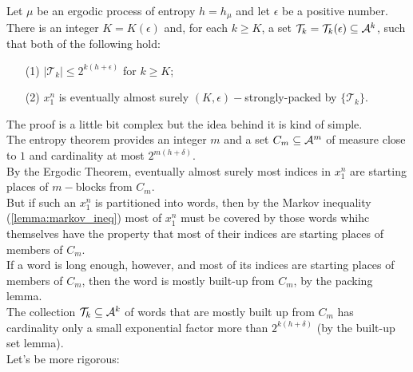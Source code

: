 \begin{lemma}
    Let $\mu$ be an ergodic process of entropy $h=h_\mu$ and let $\epsilon$ be a positive number.
    \\There is an integer $K=K(\epsilon)$ and, for each $k\geq K$, a set $\mathcal{T}_k = \mathcal{T}_k(\epsilon) \subseteq \mathcal{A}^k$, such that both of the following hold:
    \begin{itemize}
        \item[(1)] $|\mathcal{T}_k| \leq 2^{k(h+ \epsilon)}$ for $k \geq K$;
        \item[(2)] $x_1^n$ is eventually almost surely $(K, \epsilon)-$strongly-packed by $\{\mathcal{T}_k \}$.
    \end{itemize}
\end{lemma}
The proof is a little bit complex but the idea behind it is kind of simple.
\\The entropy theorem provides an integer $m$ and a set $C_m \subseteq \mathcal{A}^m$ of measure close to $1$ and cardinality at most $2^{m(h+ \delta)}$.
\\By the Ergodic Theorem, eventually almost surely most indices in $x_1^n$ are starting places of $m-$blocks from $C_m$.
\\But if such an $x_1^n$ is partitioned into words, then by the Markov inequality (\ref{lemma:markov_ineq}) most of $x_1^n$ must be covered by those words whihc themselves have the property that most of their indices are starting places of members of $C_m$.
\\If a word is long enough, however, and most of its indices are starting places of members of $C_m$, then the word is mostly built-up from $C_m$, by the packing lemma.
\\The collection $\mathcal{T}_k \subseteq \mathcal{A}^k$ of words that are mostly built up from $C_m$ has cardinality only a small exponential factor more than $2^{k(h+\delta)}$ (by the built-up set lemma).
\\Let's be more rigorous:
